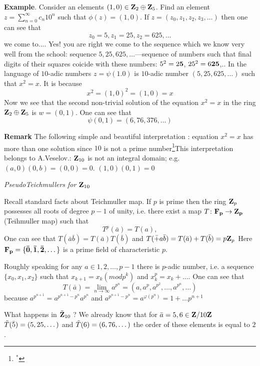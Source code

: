  {\bf Example}. Consider an elements $(1,0)\in {\bf Z}_2\oplus {\bf Z}_5$.
   Find an element $z=\sum_{n=0}^\infty c_n10^n$ such that $\phi (z)=(1,0)$.
   If $z=(z_0,z_1,z_2,z_3,\dots)$ then one can see that
                   $$
         z_0=5, z_1=25, z_2=625,...
                   $$
we come to.... Yes! you are right we come to the sequence which 
we know very well from the school:
 sequence ${5,25,625,\dots}$---sequence of numbers such that 
final digits of their squares coicide with these numbers:
   $5^2=2{\bf 5}$,  $25^2=6{\bf 25}$,..  In the language 
of $10$-adic numbers $z=\psi(1.0)$ is $10$-adic number
   $(5,25,625,\dots)$ such that $x^2=x$. It is because
                   $$
       x^2=(1,0)^2=(1,0)=x
                   $$
Now we see that the second non-trivial solution of the equation $x^2=x$ 
in the ring ${\bf Z}_2\oplus {\bf Z}_{5}$ is
$w=(0,1)$. One can see that
                   $$
       \psi(0,1)=(6,76,376,\dots)
                   $$

\m

{\bf Remark} The following simple and beautiful interpretation
 : equation $x^2=x$ has more than one solution since $10$ 
is not a prime number\footnote {$^*$}{This interpretation 
belongs to A.Veselov.}:
${\bf Z}_{10}$ is not an integral domain;
e.g. $(a,0)(0,b)=(0,0)=0$.
 $(1,0)(0,1)=0$


\bigskip

\centerline {\it PseudoTeichmullers for ${\bf Z}_{10}$\it }
\m
\def\F{\bf F}
 Recall standard facts about Teichmuller map.
If $p$ is prime then  the
ring ${\bf Z}_p$ possesses all roots of degree $p-1$ of unity, i.e. there exist a map
$T\colon \F_p\to \Z_p$ (Teihmuller map) such that
                $$
                T^p(\bar a)=T(a),
                    $$
One can see that $T(\bar a\bar b)=T(\bar a)T(\bar b)$ and $T(\bar +a\bar b)=T(\bar a)+T(\bar b)=p{\bf Z}_p$
Here $\F_p=\{\bar 0,\bar 1,\bar 2,\dots\}$ is a prime field of characteristic $p$.

 Roughly speaking for any $a\in {1,2,\dots,p-1}$ there is $p$-adic number, i.e.  a sequence $\{x_0,x_1,x_2\}$
 such that $x_{k+1}=x_k (mod p^k)$ and $x_k^p=x_k+\dots$.
 One can see that
                 $$
         T(\bar a)=\lim_{n\to\infty}a^{p^n}=(a,a^p,a^{p^2},\dots,a^{p^n},\dots)
                 $$
because $a^{p^{n+1}}=a^{p^{n+1}-p^n}a^{p^n}$ and $a^{p^{n+1}-p^n}=a^{\varphi(p^n)}=1+...p^{n+1}$


What happens in  $\tilde{{\bf Z}}_{10}$ ?  We already know that for $\bar a=5,6\in {\bf Z}\slash 10{\bf Z}$
$\tilde T(\bar 5)=(5,25,\dots)$ and $\tilde T(6)=(6,76,\dots)$
the order of these elements is equal to $2$.


